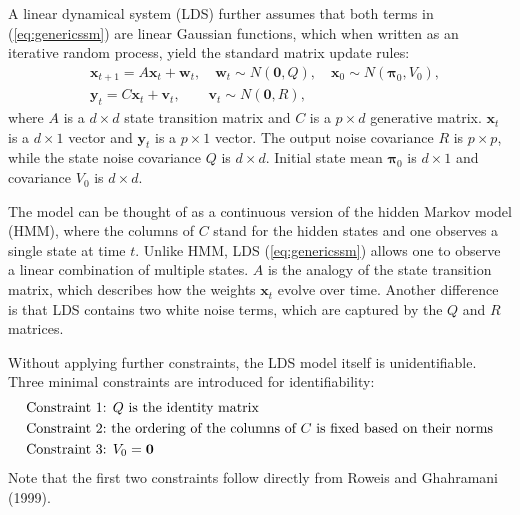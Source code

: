 \documentclass[fleqn,12pt]{article}
\let\oldref\ref
\renewcommand{\ref}[1]{(\oldref{#1})}
\providecommand{\mb}[1]{\boldsymbol{#1}}
\newcommand{\bx}{\mb{x}}
\newcommand{\by}{\mb{y}}
\newcommand{\bX}{\mb{X}}
\newcommand{\bY}{\mb{Y}}
\begin{document}
A linear dynamical system (LDS) further assumes that both terms in \ref{eq:genericssm} are linear Gaussian functions, which when written as an iterative random process, yield the standard matrix update rules:
%
%
%
\begin{equation*}
\begin{aligned}
&\bx_{t+1}=A\bx_t+\mathbf{w}_t, \quad \mathbf{w}_t\sim N(\mathbf{0},Q),\quad \bx_0 \sim N(\mathbf{\pi}_0,V_0), \\
&\by_t=C\bx_t+\mathbf{v}_t,\qquad \mathbf{v}_t\sim N(\mathbf{0},R),
\end{aligned}
\end{equation*}
where $A$ is a $d\times d$ state transition matrix and $C$ is a $p \times d$ generative matrix. $\bx_t$ is a $d\times 1$ vector and $\by_t$ is a $p\times 1$ vector.
The output noise covariance $R$ is $p\times p$, while the state noise covariance $Q$ is $d\times d$. Initial state mean $\mathbf{\pi}_0$ is $d\times 1$ and covariance $V_0$ is $d \times d$.

The model can be thought of as a continuous version of the hidden Markov model (HMM), where the columns of $C$ stand for the hidden states and one observes a single state at time $t$. Unlike HMM, LDS \ref{eq:genericssm} allows one to observe a linear combination of multiple states. $A$ is the analogy of the state transition matrix, which describes how the weights $\bx_t$ evolve over time. Another difference is that LDS contains two white noise terms, which are captured by the $Q$ and $R$ matrices.

Without applying further constraints, the LDS model itself is unidentifiable. Three minimal constraints are introduced for identifiability:
\vspace*{-3mm}
\begin{equation*}\label{eq:constraints1}
\begin{aligned}
&\text{Constraint 1: }Q \text{ is the identity matrix}\\
&\text{\text{Constraint 2:} the ordering of the columns of } C \text{ is fixed based on their norms}\\
&\text{Constraint 3: } V_0=\mathbf{0}
\end{aligned}
\end{equation*}
Note that the first two constraints follow directly from Roweis and Ghahramani (1999).
\end{document}
